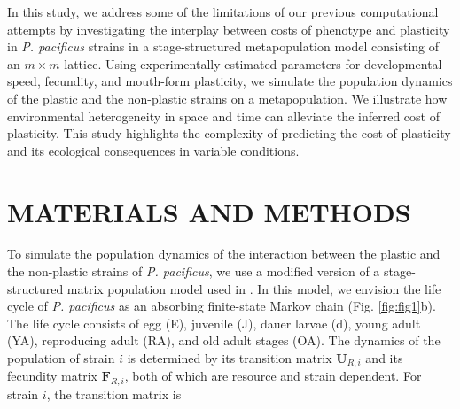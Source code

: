 \documentclass[10pt,letterpaper]{article}
\newcommand{\ppac}{\emph{P. pacificus}}
\begin{document}
\hspace{5cm}

In this study, we address some of the limitations of our previous computational attempts by investigating the interplay between costs of phenotype and plasticity in \ppac{} strains in a stage-structured metapopulation model consisting of an $m\times m$ lattice. Using experimentally-estimated parameters for developmental speed, fecundity, and mouth-form plasticity, we simulate the population dynamics of the plastic and the non-plastic strains on a metapopulation. We illustrate how environmental heterogeneity in space and time can alleviate the inferred cost of plasticity. This study highlights the complexity of predicting the cost of plasticity and its ecological consequences in variable conditions. 

\section*{MATERIALS AND METHODS}

To simulate the population dynamics of the interaction between the plastic and the non-plastic strains of \ppac{}, we use a modified version of a stage-structured matrix population model used in \cite{Dardiry2023}. In this model, we envision the life cycle of \ppac{} as an absorbing finite-state Markov chain \cite{Keyfitz2005, Caswell2019} (Fig. \ref{fig:fig1}b). The life cycle consists of egg (E), juvenile (J), dauer larvae (d), young adult (YA), reproducing adult (RA), and old adult stages (OA). The dynamics of the population of strain $i$ is determined by its transition matrix $\mathbf{U}_{R,i}$ and its fecundity matrix $\mathbf{F}_{R,i}$, both of which are resource and strain dependent. For strain $i$, the transition matrix is
\end{document}
